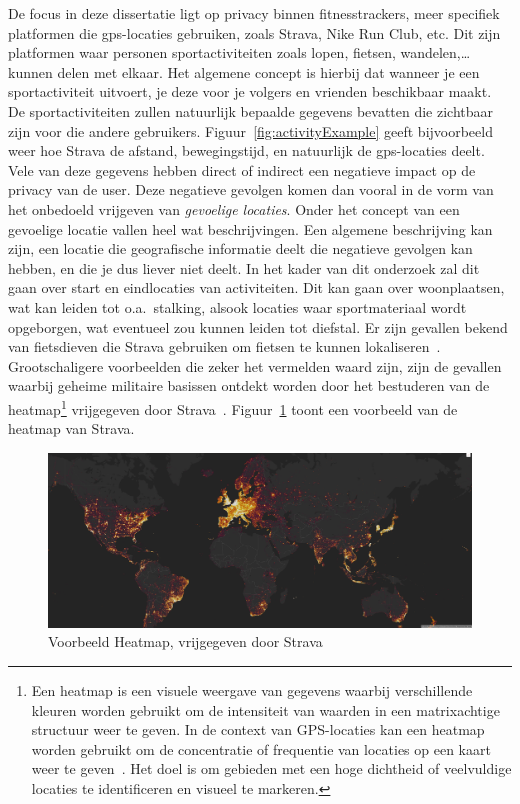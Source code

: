 De focus in deze dissertatie ligt op privacy binnen fitnesstrackers, meer
specifiek platformen die \ac{gps}-locaties gebruiken, zoals Strava, Nike Run
Club, etc. Dit zijn platformen waar personen sportactiviteiten zoals lopen,
fietsen, wandelen,\ldots kunnen delen met elkaar. Het algemene concept is
hierbij dat wanneer je een sportactiviteit uitvoert, je deze voor je volgers en
vrienden beschikbaar maakt. De sportactiviteiten zullen natuurlijk bepaalde
gegevens bevatten die zichtbaar zijn voor die andere gebruikers.
Figuur~\ref{fig:activityExample} geeft bijvoorbeeld weer hoe Strava de afstand,
bewegingstijd, en natuurlijk de \ac{gps}-locaties deelt. Vele van deze gegevens
hebben direct of indirect een negatieve impact op de privacy van de user. Deze
negatieve gevolgen komen dan vooral in de vorm van het onbedoeld vrijgeven van
\textit{gevoelige locaties}. Onder het concept van een gevoelige locatie vallen
heel wat beschrijvingen. Een algemene beschrijving kan zijn, een locatie die
geografische informatie deelt die negatieve gevolgen kan hebben, en die je dus
liever niet deelt. In het kader van dit onderzoek zal dit gaan over start en
eindlocaties van activiteiten. Dit kan gaan over woonplaatsen, wat kan leiden
tot o.a.\ stalking, alsook locaties waar sportmateriaal wordt opgeborgen, wat
eventueel zou kunnen leiden tot diefstal. Er zijn gevallen bekend van
fietsdieven die Strava gebruiken om fietsen te kunnen
lokaliseren~\cite{Sportapp72:online, Cyclistw89:online}. Grootschaligere
voorbeelden die zeker het vermelden waard zijn, zijn de gevallen waarbij
geheime militaire basissen ontdekt worden door het bestuderen van de
heatmap\footnote{Een heatmap is een visuele weergave van gegevens waarbij
    verschillende kleuren worden gebruikt om de intensiteit van waarden in een
    matrixachtige structuur weer te geven. In de context van GPS-locaties kan een
    heatmap worden gebruikt om de concentratie of frequentie van locaties op een
    kaart weer te geven~\cite{Whatishe21:online}. Het doel is om gebieden met een
    hoge dichtheid of veelvuldige locaties te identificeren en visueel te
    markeren.} vrijgegeven door Strava~\cite{Fitnesst33:online}.
Figuur~\ref{fig:heatmap} toont een voorbeeld van de heatmap van Strava.
\begin{figure}
    \centering
    \includegraphics[width=\textwidth]{fig/Heatmap_strava.png}
    \caption{Voorbeeld Heatmap, vrijgegeven door Strava~\cite{StravaGl10:online}}\label{fig:heatmap}
\end{figure}

